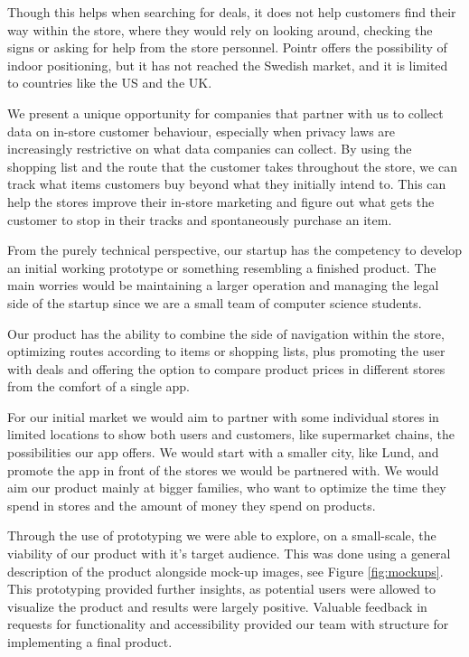 \documentclass[titlepage]{article}
\begin{document}
Though this helps when searching for deals, it does not help customers find their way within the store, where they would rely on looking around, checking the signs or asking for help from the store personnel. Pointr offers the possibility of indoor positioning, but it has not reached the Swedish market, and it is limited to countries like the US and the UK. 

We present a unique opportunity for companies that partner with us to collect data on in-store customer behaviour, especially when privacy laws are increasingly restrictive on what data companies can collect. By using the shopping list and the route that the customer takes throughout the store, we can track what items customers buy beyond what they initially intend to. This can help the stores improve their in-store marketing and figure out what gets the customer to stop in their tracks and spontaneously purchase an item.

From the purely technical perspective, our startup has the competency to develop an initial working prototype or something resembling a finished product. The main worries would be maintaining a larger operation and managing the legal side of the startup since we are a small team of computer science students.

Our product has the ability to combine the side of navigation within the store, optimizing routes according to items or shopping lists, plus promoting the user with deals and offering the option to compare product prices in different stores from the comfort of a single app.

For our initial market we would aim to partner with some individual stores in limited locations to show both users and customers, like supermarket chains, the possibilities our app offers. We would start with a smaller city, like Lund, and promote the app in front of the stores we would be partnered with. We would aim our product mainly at bigger families, who want to optimize the time they spend in stores and the amount of money they spend on products.

Through the use of prototyping we were able to explore, on a small-scale, the viability of our product with it's target audience. This was done using a general description of the product alongside mock-up images, see Figure \ref{fig:mockups}.
This prototyping provided further insights, as potential users were allowed to visualize the product and results were largely positive. Valuable feedback in requests for functionality and accessibility provided our team with structure for implementing a final product.
\end{document}
